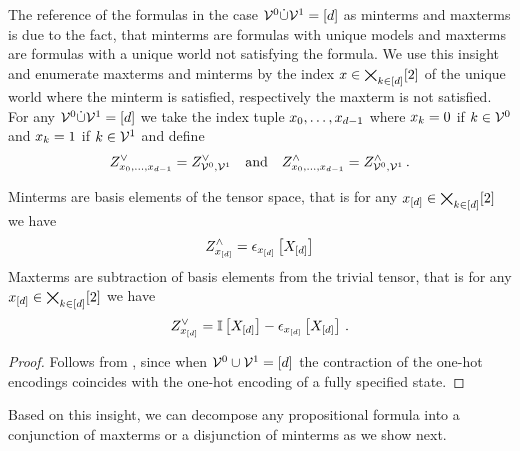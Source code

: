 %
The reference of the formulas in the case $\mathcal{V}^{0}\dot{\cup}\mathcal{V}^{1} = [d]$ as minterms and maxterms is due to the fact, that minterms are formulas with unique models and maxterms are formulas with a unique world not satisfying the formula.
We use this insight and enumerate maxterms and minterms by the index $x\in\bigtimes_{k\in[d]}[2]$ of the unique world where the minterm is satisfied, respectively the maxterm is not satisfied.
For any $\mathcal{V}^{0}\dot{\cup}\mathcal{V}^{1} = [d]$ we take the index tuple $x_{0},\ldots,x_{d-1}$ where $x_{k}=0$ if $k\in\mathcal{V}^{0}$ and $x_{k}=1$ if $k\in\mathcal{V}^{1}$ and define
\begin{align*}
    Z^{\lor}_{x_{0},\ldots,x_{d-1}} = Z^{\lor}_{\mathcal{V}^{0},\mathcal{V}^{1}} \quad\text{and}\quad Z^{\land}_{x_{0},\ldots,x_{d-1}} = Z^{\land}_{\mathcal{V}^{0},\mathcal{V}^{1}} \, .
\end{align*}


\begin{corollary}
    Minterms are basis elements of the tensor space, that is for any $x_{[d]}\in\bigtimes_{k\in[d]}[2]$ we have
    \begin{align*}
        Z^{\land}_{x_{[d]}} = \epsilon_{x_{[d]}}\left[X_{[d]}\right]
    \end{align*}
    Maxterms are subtraction of basis elements from the trivial tensor, that is for any $x_{[d]}\in\bigtimes_{k\in[d]}[2]$ we have
    \begin{align*}
        Z^{\lor}_{x_{[d]}} = \mathbb{I}\left[X_{[d]}\right] - \epsilon_{x_{[d]}}\left[X_{[d]}\right]  \, .
    \end{align*}
\end{corollary}
\begin{proof}
    Follows from , since when $\mathcal{V}^{0}\cup\mathcal{V}^{1} = [d]$ the contraction of the one-hot encodings coincides with the one-hot encoding of a fully specified state.
\end{proof}


Based on this insight, we can decompose any propositional formula into a conjunction of maxterms or a disjunction of minterms as we show next.

\newpage

